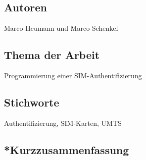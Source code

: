 \subsection*{Autoren}
Marco Heumann und Marco Schenkel

\subsection*{Thema der Arbeit}
Programmierung einer SIM-Authentifizierung

\subsection*{Stichworte}
Authentifizierung, SIM-Karten, UMTS

\subsection{*Kurzzusammenfassung}